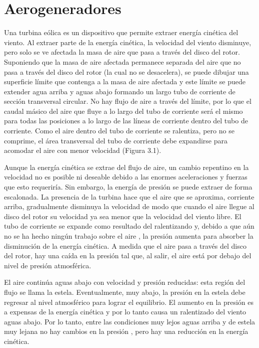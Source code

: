 \chapter{Aerogeneradores} 


Una turbina eólica es un dispositivo que permite extraer energía cinética del viento. Al extraer parte de la energía cinética, la velocidad del viento disminuye, pero solo se ve afectada la masa de aire que pasa a través del disco del rotor. Suponiendo que la masa de aire afectada permanece separada del aire que no pasa a través del disco del rotor (la cual no se desacelera), se puede dibujar una superficie límite que contenga a la masa de aire afectada y este límite se puede extender agua arriba y aguas abajo formando un largo tubo de corriente de sección transversal circular. No hay flujo de aire a través del límite, por lo que el caudal másico del aire que fluye a lo largo del tubo de corriente será el mismo para todas las posiciones a lo largo de las líneas de corriente dentro del tubo de corriente. Como el aire dentro del tubo de corriente se ralentiza, pero no se comprime, el área transversal del tubo de corriente debe expandirse para acomodar el aire con menor velocidad (Figura 3.1).


Aunque la energía cinética se extrae del flujo de aire, un cambio repentino en la velocidad no es posible ni deseable debido a las enormes aceleraciones y fuerzas que esto requeriría. Sin embargo, la energía de presión se puede extraer de forma escalonada. La presencia de la turbina hace que el aire que se aproxima, corriente arriba, gradualmente disminuya la velocidad de modo que cuando el aire llegue al disco del rotor su velocidad ya sea menor que la velocidad del viento libre. El tubo de corriente se expande como resultado del ralentizando y, debido a que aún no se ha hecho ningún trabajo sobre el aire %
, la presión aumenta para absorber la disminución de la energía cinética. A medida que el aire pasa a través del disco del rotor, hay una caída en la presión %
tal que, al salir, el aire está por debajo del nivel de presión atmosférica. 

El aire continúa aguas abajo con velocidad y presión %
reducidas: esta región del flujo se llama la estela. Eventualmente, muy abajo, la presión %
en la estela debe regresar al nivel atmosférico para lograr el equilibrio. El aumento en la presión %
es a expensas de la energía cinética y por lo tanto causa un ralentizado del viento aguas abajo. Por lo tanto, entre las condiciones muy lejos aguas arriba y de estela muy lejana no hay cambios en la presión %
, pero hay una reducción en la energía cinética.

